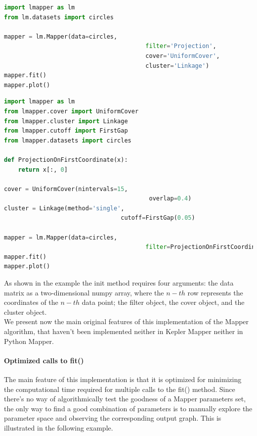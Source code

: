 \begin{lstlisting}[language=Python, caption=Example 3 for the Mapper class. The arguments of the init function can be strings.]
import lmapper as lm
from lm.datasets import circles

mapper = lm.Mapper(data=circles,
										filter='Projection',
										cover='UniformCover',
										cluster='Linkage')
mapper.fit()
mapper.plot()
\end{lstlisting}

\begin{lstlisting}[language=Python, caption=Example 4 for the Mapper class. The filter given to the init function of the Mapper object can be a Python function.]
import lmapper as lm
from lmapper.cover import UniformCover
from lmapper.cluster import Linkage
from lmapper.cutoff import FirstGap
from lmapper.datasets import circles

def ProjectionOnFirstCoordinate(x):
	return x[:, 0]
	
cover = UniformCover(nintervals=15,
										 overlap=0.4)
cluster = Linkage(method='single',
								 cutoff=FirstGap(0.05)

mapper = lm.Mapper(data=circles,
										filter=ProjectionOnFirstCoordinate)
mapper.fit()
mapper.plot()
\end{lstlisting}


As shown in the example the init method requires four arguments: the data matrix as a two-dimensional numpy array, where the $n-th$ row represents the coordinates of the $n-th$ data point; the filter object, the cover object, and the cluster object. \\
We present now the main original features of this implementation of the Mapper algorithm, that haven't been implemented neither in Kepler Mapper neither in Python Mapper.

\paragraph{Optimized calls to fit()}
The main feature of this implementation is that it is optimized for minimizing the computational time required for multiple calls to the fit() method. Since there's no way of algorithmically test the goodness of a Mapper parameters set, the only way to find a good combination of parameters is to manually explore the parameter space and observing the corresponding output graph. This is illustrated in the following example.


